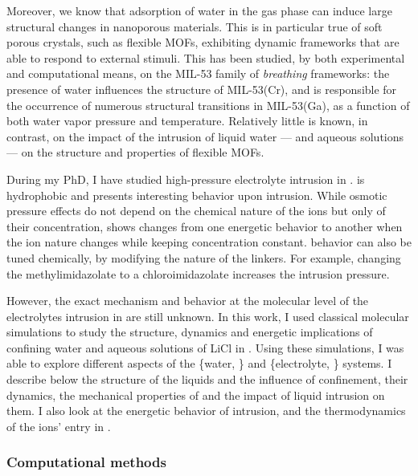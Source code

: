 \documentclass[thesis]{subfiles}
\begin{document}
Moreover, we know that adsorption of water in the gas phase can induce large
structural changes in nanoporous materials\cite{Lee2001, Seoung2013}. This is in
particular true of soft porous crystals\cite{Horike2009}, such as flexible
MOFs\cite{Schneemann2014}, exhibiting dynamic frameworks that are able to
respond to external stimuli. This has been studied, by both experimental and
computational means, on the MIL-53 family of \emph{breathing} frameworks: the
presence of water influences the structure of MIL-53(Cr)\cite{Haigis2013}, and
is responsible for the occurrence of numerous structural transitions in
MIL-53(Ga), as a function of both water vapor pressure and
temperature\cite{Boutin2013, Coudert2014}. Relatively little is known, in
contrast, on the impact of the intrusion of liquid water --- and aqueous
solutions --- on the structure and properties of flexible MOFs.

During my PhD, I have studied high-pressure electrolyte intrusion in .
 is hydrophobic\cite{AOrtiz2014} and presents interesting behavior upon
intrusion. While osmotic pressure effects do not depend on the chemical nature
of the ions but only of their concentration,  shows changes from one
energetic behavior to another when the ion nature changes while keeping
concentration constant\cite{Ortiz2014}.  behavior can also be tuned
chemically, by modifying the nature of the linkers. For example, changing the
methylimidazolate to a chloroimidazolate increases the intrusion
pressure\cite{Mortada2018}.

However, the exact mechanism and behavior at the molecular level of the
electrolytes intrusion in  are still unknown. In this work, I used
classical molecular simulations to study the structure, dynamics and energetic
implications of confining water and aqueous solutions of LiCl in . Using
these simulations, I was able to explore different aspects of the \{water,
\} and \{electrolyte, \} systems. I describe below the structure of
the liquids and the influence of confinement, their dynamics, the mechanical
properties of  and the impact of liquid intrusion on them. I also look at
the energetic behavior of intrusion, and the thermodynamics of the ions' entry
in .

\subsubsection{Computational methods}
\end{document}
